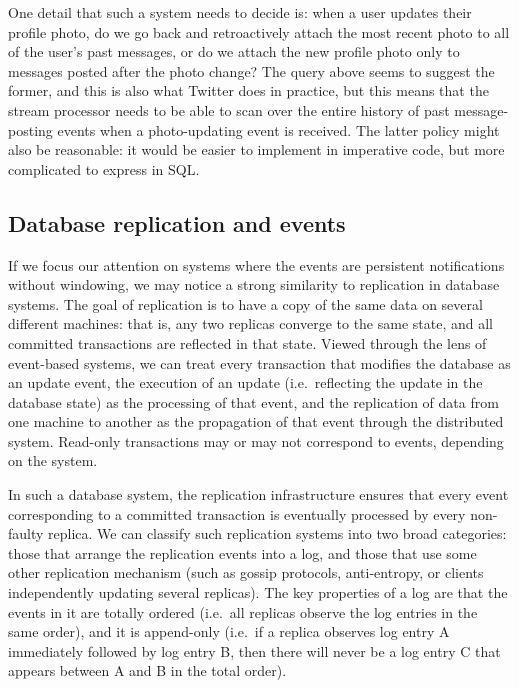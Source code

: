 \documentclass[sigconf,nonacm]{acmart}
\begin{document}
One detail that such a system needs to decide is: when a user updates their profile photo, do we go back and retroactively attach the most recent photo to all of the user's past messages, or do we attach the new profile photo only to messages posted after the photo change?
The query above seems to suggest the former, and this is also what Twitter does in practice, but this means that the stream processor needs to be able to scan over the entire history of past message-posting events when a photo-updating event is received.
The latter policy might also be reasonable: it would be easier to implement in imperative code, but more complicated to express in SQL.

\subsection{Database replication and events}\label{sec:replication}

If we focus our attention on systems where the events are persistent notifications without windowing, we may notice a strong similarity to replication in database systems.
The goal of replication is to have a copy of the same data on several different machines: that is, any two replicas converge to the same state, and all committed transactions are reflected in that state.
Viewed through the lens of event-based systems, we can treat every transaction that modifies the database as an update event, the execution of an update (i.e.\ reflecting the update in the database state) as the processing of that event, and the replication of data from one machine to another as the propagation of that event through the distributed system.
Read-only transactions may or may not correspond to events, depending on the system.

In such a database system, the replication infrastructure ensures that every event corresponding to a committed transaction is eventually processed by every non-faulty replica.
We can classify such replication systems into two broad categories: those that arrange the replication events into a log, and those that use some other replication mechanism (such as gossip protocols, anti-entropy, or clients independently updating several replicas).
The key properties of a log are that the events in it are totally ordered (i.e.\ all replicas observe the log entries in the same order), and it is append-only (i.e.\ if a replica observes log entry A immediately followed by log entry B, then there will never be a log entry C that appears between A and B in the total order).
\end{document}
